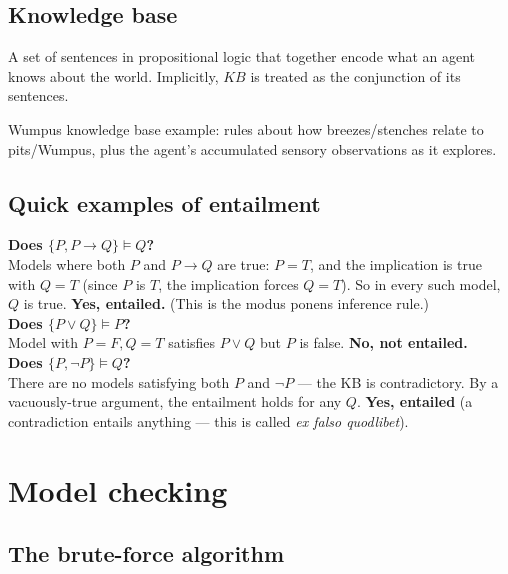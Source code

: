 \documentclass[11pt, a4paper]{article}
\begin{document}
\subsection{Knowledge base}

\begin{defbox}
A set of sentences in propositional logic that together encode what an agent knows about the world. Implicitly, $KB$ is treated as the conjunction of its sentences.
\end{defbox}

Wumpus knowledge base example: rules about how breezes/stenches relate to pits/Wumpus, plus the agent's accumulated sensory observations as it explores.

\subsection{Quick examples of entailment}

\begin{exbox}
\textbf{Does $\{P, P \rightarrow Q\} \models Q$?}\\
Models where both $P$ and $P \rightarrow Q$ are true: $P = T$, and the implication is true with $Q = T$ (since $P$ is $T$, the implication forces $Q = T$). So in every such model, $Q$ is true. \textbf{Yes, entailed.} (This is the modus ponens inference rule.)\\[0.3em]
\textbf{Does $\{P \lor Q\} \models P$?}\\
Model with $P = F, Q = T$ satisfies $P \lor Q$ but $P$ is false. \textbf{No, not entailed.}\\[0.3em]
\textbf{Does $\{P, \neg P\} \models Q$?}\\
There are no models satisfying both $P$ and $\neg P$ — the KB is contradictory. By a vacuously-true argument, the entailment holds for any $Q$. \textbf{Yes, entailed} (a contradiction entails anything — this is called \emph{ex falso quodlibet}).
\end{exbox}

\section{Model checking}

\subsection{The brute-force algorithm}
\end{document}
